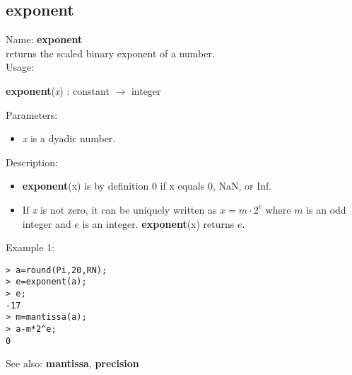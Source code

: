 \subsection{ exponent }
\noindent Name: \textbf{exponent}\\
returns the scaled binary exponent of a number.\\

\noindent Usage: 
\begin{center}
\textbf{exponent}(\emph{x}) : \textsf{constant} $\rightarrow$ \textsf{integer}\\
\end{center}
Parameters: 
\begin{itemize}
\item \emph{x} is a dyadic number.
\end{itemize}
\noindent Description: \begin{itemize}

\item \textbf{exponent}(x) is by definition 0 if x equals 0, NaN, or Inf.

\item If \emph{x} is not zero, it can be uniquely written as $x = m \cdot 2^e$ where
   $m$ is an odd integer and $e$ is an integer. \textbf{exponent}(x) returns $e$. 
\end{itemize}
\noindent Example 1: 
\begin{center}\begin{minipage}{15cm}\begin{Verbatim}[frame=single]
> a=round(Pi,20,RN);
> e=exponent(a);
> e;
-17
> m=mantissa(a);
> a-m*2^e;
0
\end{Verbatim}
\end{minipage}\end{center}
See also: \textbf{mantissa}, \textbf{precision}
